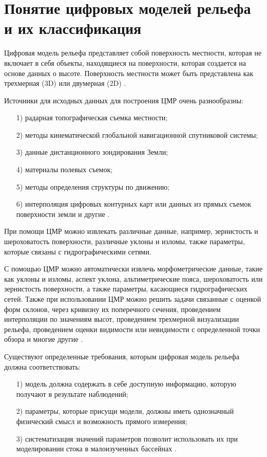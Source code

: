 \chapter{Понятие цифровых моделей рельефа и их классификация}

Цифровая модель рельефа представляет собой поверхность местности, которая не включает в себя объекты, находящиеся на поверхности, которая создается на основе данных о высоте. Поверхность местности может быть представлена как трехмерная (3D) или двумерная (2D) \cite {1, 23}.

Источники для исходных данных для построения ЦМР очень разнообразны: 

\begin{enumerate} 
  \item[1)] радарная топографическая съемка местности;
  \item[2)] методы кинематической глобальной навигационной спутниковой системы;
  \item[3)] данные дистанционного зондирования Земли;
  \item[4)] материалы полевых съемок;
  \item[5)] методы определения структуры по движению;
  \item[6)] интерполяция цифровых контурных карт или данных из прямых съемок поверхности земли и другие \cite{2, 17}.
\end{enumerate}

При помощи ЦМР можно извлекать различные данные, например, зернистость и шероховатость поверхности, различные уклоны и изломы, также параметры, которые связаны с гидрографическими сетями. 

С помощью ЦМР можно автоматически извлечь морфометрические данные, такие как уклоны и изломы, аспект уклона, альтиметрические пояса, шероховатость или зернистость поверхности, а также параметры, касающиеся гидрографических сетей. Также при использовании ЦМР можно решить задачи связанные с оценкой форм склонов, через кривизну их поперечного сечения, проведением интерполяции по значениям высот, проведением трехмерной визуализации рельефа, проведением оценки видимости или невидимости  с определенной точки обзора и многие другие \cite{15,13}.

Существуют определенные требования, которым цифровая модель рельефа должна соответствовать:

\begin{enumerate} 
  \item[1)] модель должна содержать в себе доступную информацию, которую получают в результате наблюдений;
  \item[2)] параметры, которые присущи модели, должны иметь однозначный физический смысл и возможность прямого измерения;
  \item[3)] систематизация значений параметров позволит использовать их при моделировании стока в малоизученных бассейнах \cite{3,21}.
\end{enumerate} 

